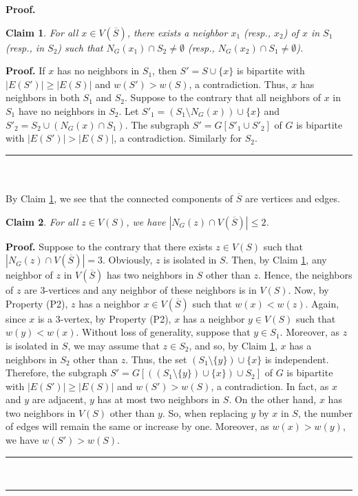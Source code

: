 \documentclass[12pt, oneside]{scrartcl}
\newtheorem{claim}{Claim}[theorem]
\newenvironment{proof}[1][Proof]{\textbf{#1.} }{\ \rule{0.5em}{0.5em}}
\begin{document}
\begin{proof}
\begin{claim}\label{Claim1}
For all $x\in V(\overline{S})$, there exists a neighbor $x_1$ (resp., $x_2$) of $x$ in $S_1$ (resp., in $S_2$) such that $N_G(x_1)\cap S_2\neq\emptyset$ (resp., $N_G(x_2)\cap S_1\neq \emptyset$).
\end{claim}
\begin{proof}
If $x$ has no neighbors in $S_1$, then $S'=S\cup \{x\}$ is bipartite with $|E(S')|\geq |E(S)|$ and $w(S')>w(S)$, a contradiction. Thus, $x$ has neighbors in both $S_1$ and $S_2$. Suppose to the contrary that all neighbors of $x$ in $S_1$ have no neighbors in $S_2$. Let $S'_1=(S_1\setminus N_G(x))\cup \{x\}$ and $S'_2=S_2\cup (N_G(x)\cap S_1)$. The subgraph $S'=G[S'_1\cup S'_2]$ of $G$ is bipartite with $|E(S')|> |E(S)|$, a contradiction. Similarly for $S_2$.
\end{proof}\\
\\
By Claim \ref{Claim1}, we see that the connected components of $\overline{S}$ are vertices and edges. 
\begin{claim}\label{Claim2}
For all $z\in V(S)$, we have $|N_G(z)\cap V(\overline{S})|\leq 2$.
\end{claim}
\begin{proof}
Suppose to the contrary that there exists $z\in V(S)$ such that $|N_G(z)\cap V(\overline{S})|=3$. Obviously, $z$ is isolated in $S$. Then, by Claim \ref{Claim1}, any neighbor of $z$ in $V(\overline{S})$ has two neighbors in $S$ other than $z$. Hence, the neighbors of $z$ are $3$-vertices and any neighbor of these neighbors is in $V(S)$. Now, by Property (P2), $z$ has a neighbor $x\in V(\overline{S})$ such that $w(x)<w(z)$. Again, since $x$ is a $3$-vertex, by Property (P2), $x$ has a neighbor $y\in V(S)$ such that $w(y)<w(x)$. Without loss of generality, suppose that $y\in S_1$. Moreover, as $z$ is isolated in $S$, we may assume that $z\in S_2$, and so, by Claim \ref{Claim1}, $x$ has a neighbors in $S_2$ other than $z$. Thus, the set $(S_1\setminus \{y\})\cup \{x\}$ is independent. Therefore, the subgraph $S'=G[((S_1\setminus \{y\})\cup \{x\})\cup S_2]$ of $G$ is bipartite with $|E(S')|\geq |E(S)|$ and $w(S')>w(S)$, a contradiction. In fact, as $x$ and $y$ are adjacent, $y$ has at most two neighbors in $S$. On the other hand, $x$ has two neighbors in $V(S)$ other than $y$. So, when replacing $y$ by $x$ in $S$, the number of edges will remain the same or increase by one. Moreover, as $w(x)>w(y)$, we have $w(S')>w(S)$.
\end{proof}


\end{proof}
\end{document}
